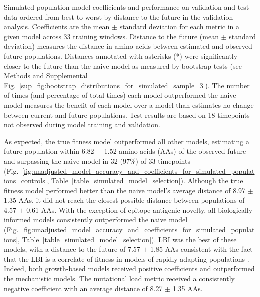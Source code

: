 \begin{table}[htb]
  \begin{center}
    \scalebox{0.9}{
      
    }
    \caption{
      Simulated population model coefficients and performance on validation and test data ordered from best to worst by distance to the future in the validation analysis.
      Coefficients are the mean $\pm$ standard deviation for each metric in a given model across 33 training windows.
      Distance to the future (mean $\pm$ standard deviation) measures the distance in amino acids between estimated and observed future populations.
      Distances annotated with asterisks (*) were significantly closer to the future than the naive model as measured by bootstrap tests (see Methods and Supplemental Fig.~\ref{sup_fig:bootstrap_distributions_for_simulated_sample_3}).
      The number of times (and percentage of total times) each model outperformed the naive model measures the benefit of each model over a model than estimates no change between current and future populations.
      Test results are based on 18 timepoints not observed during model training and validation.
    }
    \label{table_simulated_model_selection}
  \end{center}
\end{table}

As expected, the true fitness model outperformed all other models, estimating a future population within 6.82 $\pm$ 1.52 amino acids (AAs) of the observed future and surpassing the naive model in 32 (97\%) of 33 timepoints (Fig.~\ref{fig:unadjusted_model_accuracy_and_coefficients_for_simulated_populations_controls}, Table~\ref{table_simulated_model_selection}).
Although the true fitness model performed better than the naive model's average distance of 8.97 $\pm$ 1.35 AAs, it did not reach the closest possible distance between populations of 4.57 $\pm$ 0.61 AAs.
With the exception of epitope antigenic novelty, all biologically-informed models consistently outperformed the naive model (Fig.~\ref{fig:unadjusted_model_accuracy_and_coefficients_for_simulated_populations}, Table~\ref{table_simulated_model_selection}).
LBI was the best of these models, with a distance to the future of 7.57 $\pm$ 1.85 AAs consistent with the fact that the LBI is a correlate of fitness in models of rapidly adapting populations \cite{Neher:2014eu}.
Indeed, both growth-based models received positive coefficients and outperformed the mechanistic models.
The mutational load metric received a consistently negative coefficient with an average distance of 8.27 $\pm$ 1.35 AAs.

